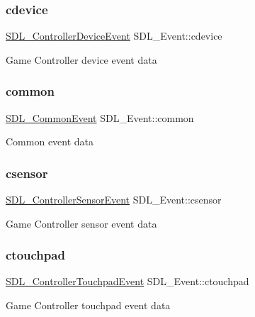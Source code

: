 \subsubsection{\texorpdfstring{cdevice}{cdevice}}
{\footnotesize\ttfamily \mbox{\hyperlink{struct_s_d_l___controller_device_event}{S\+D\+L\+\_\+\+Controller\+Device\+Event}} S\+D\+L\+\_\+\+Event\+::cdevice}

Game Controller device event data \mbox{\label{union_s_d_l___event_abe5cb8767f93de55163c8ddd4562a7f2}} 
\subsubsection{\texorpdfstring{common}{common}}
{\footnotesize\ttfamily \mbox{\hyperlink{struct_s_d_l___common_event}{S\+D\+L\+\_\+\+Common\+Event}} S\+D\+L\+\_\+\+Event\+::common}

Common event data \mbox{\label{union_s_d_l___event_adcfd6caae4067c338ddd6570ddb37417}} 
\subsubsection{\texorpdfstring{csensor}{csensor}}
{\footnotesize\ttfamily \mbox{\hyperlink{struct_s_d_l___controller_sensor_event}{S\+D\+L\+\_\+\+Controller\+Sensor\+Event}} S\+D\+L\+\_\+\+Event\+::csensor}

Game Controller sensor event data \mbox{\label{union_s_d_l___event_af380462bb505815bd9cb19c2d9c5a61c}} 
\subsubsection{\texorpdfstring{ctouchpad}{ctouchpad}}
{\footnotesize\ttfamily \mbox{\hyperlink{struct_s_d_l___controller_touchpad_event}{S\+D\+L\+\_\+\+Controller\+Touchpad\+Event}} S\+D\+L\+\_\+\+Event\+::ctouchpad}

Game Controller touchpad event data \mbox{\label{union_s_d_l___event_a4481167b9f8549aeb254e97ca812e74d}} 
